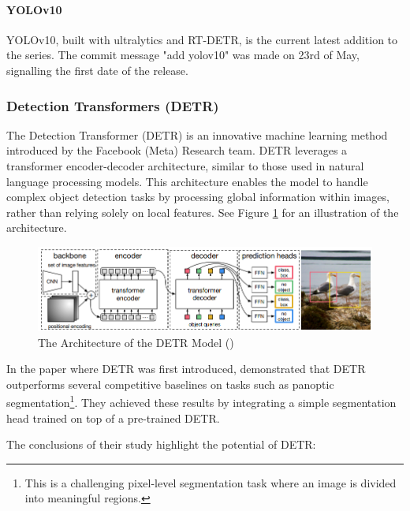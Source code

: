 \paragraph{YOLOv10}
YOLOv10, built with ultralytics and RT-DETR, is the current latest addition to the series. The commit message "add yolov10" was made on 23rd of May, signalling the first date of the release.

\subsubsection{Detection Transformers (DETR)}
\label{sec:detr}
The Detection Transformer (DETR) is an innovative machine learning method introduced by the Facebook (Meta) Research team. DETR leverages a transformer encoder-decoder architecture, similar to those used in natural language processing models. This architecture enables the model to handle complex object detection tasks by processing global information within images, rather than relying solely on local features. See Figure \ref{fig:detrarchitecture} for an illustration of the architecture.

\begin{figure}[H]
\centering
\includegraphics[width=1\linewidth]{Images/Diagrams/DETR2.png}
\caption{\centering The Architecture of the DETR Model (\cite{carion2020endtoend})}
\label{fig:detrarchitecture}
\end{figure}

In the paper where DETR was first introduced, \citeauthor{carion2020endtoend} demonstrated that DETR outperforms several competitive baselines on tasks such as panoptic segmentation\footnote{This is a challenging pixel-level segmentation task where an image is divided into meaningful regions.}. They achieved these results by integrating a simple segmentation head trained on top of a pre-trained DETR.

\newpage
The conclusions of their study highlight the potential of DETR:

